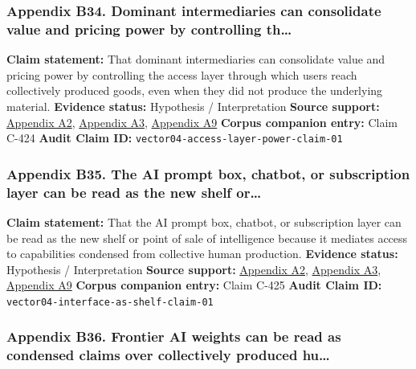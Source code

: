 \documentclass[
  american,
  11pt,
  letterpaper,
]{article}
\begin{document}
\subsubsection{Appendix B34. Dominant intermediaries can consolidate
value and pricing power by controlling
th\ldots{}}\label{ch-04-appendix-b34-dominant-intermediaries-can-consolidate-value-and-pricing-power-by-controlling-th}

\textbf{Claim statement:} That dominant intermediaries can consolidate
value and pricing power by controlling the access layer through which
users reach collectively produced goods, even when they did not produce
the underlying material. \textbf{Evidence status:} Hypothesis /
Interpretation \textbf{Source support:}
\hyperref[ch-04-appendix-a2-language-models-are-unsupervised-multitask-learners]{Appendix
A2},
\hyperref[ch-04-appendix-a3-reddit-strikes-60m-deal-allowing-google-to-train-ai-models-on-its-posts-unveils-ipo-plans]{Appendix
A3},
\hyperref[ch-04-appendix-a9-the-problem-with-annotation-human-labour-and-outsourcing-between-france-and-madagascar]{Appendix
A9} \textbf{Corpus companion entry:} Claim C-424 \textbf{Audit Claim
ID:} \texttt{vector04-access-layer-power-claim-01}

\subsubsection{Appendix B35. The AI prompt box, chatbot, or subscription
layer can be read as the new shelf
or\ldots{}}\label{ch-04-appendix-b35-the-ai-prompt-box-chatbot-or-subscription-layer-can-be-read-as-the-new-shelf-or}

\textbf{Claim statement:} That the AI prompt box, chatbot, or
subscription layer can be read as the new shelf or point of sale of
intelligence because it mediates access to capabilities condensed from
collective human production. \textbf{Evidence status:} Hypothesis /
Interpretation \textbf{Source support:}
\hyperref[ch-04-appendix-a2-language-models-are-unsupervised-multitask-learners]{Appendix
A2},
\hyperref[ch-04-appendix-a3-reddit-strikes-60m-deal-allowing-google-to-train-ai-models-on-its-posts-unveils-ipo-plans]{Appendix
A3},
\hyperref[ch-04-appendix-a9-the-problem-with-annotation-human-labour-and-outsourcing-between-france-and-madagascar]{Appendix
A9} \textbf{Corpus companion entry:} Claim C-425 \textbf{Audit Claim
ID:} \texttt{vector04-interface-as-shelf-claim-01}

\subsubsection{Appendix B36. Frontier AI weights can be read as
condensed claims over collectively produced
hu\ldots{}}\label{ch-04-appendix-b36-frontier-ai-weights-can-be-read-as-condensed-claims-over-collectively-produced-hu}
\end{document}
